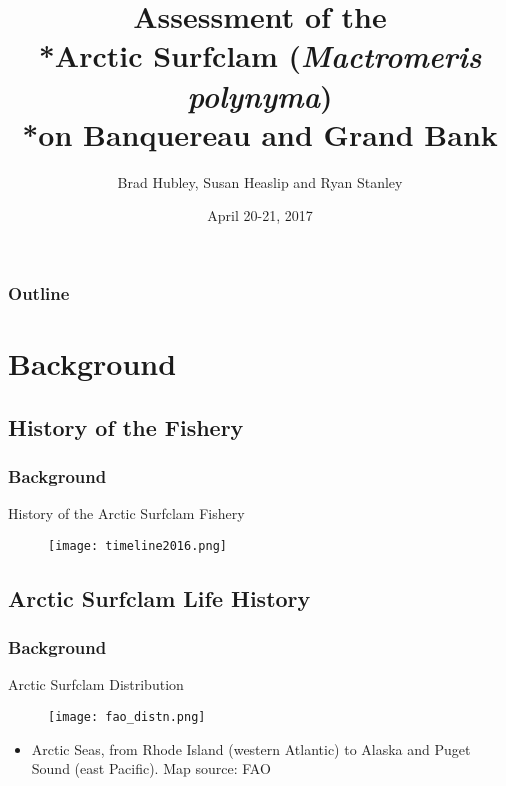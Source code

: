 \documentclass{beamer}
\title[Surfclam Assessment]{Assessment of the \\*Arctic Surfclam (\textit{Mactromeris polynyma}) \\*on Banquereau and Grand Bank}
\author{Brad Hubley, Susan Heaslip and Ryan Stanley}
\institute[DFO]{Science Branch, Fisheries and Oceans Canada}
\date{April 20-21, 2017}
\begin{document}
 
\frame{\titlepage}
 

\begin{frame}
\frametitle{Outline}
\tableofcontents
\end{frame}



\section{Background}
\subsection{History of the Fishery}
\begin{frame}
\frametitle{Background}
History of the Arctic Surfclam Fishery
\begin{figure}
        \begin{center}
            \texttt{[image: timeline2016.png]}
   \vspace{1cm}
	\end{center}
   
 \end{figure}

\end{frame}


\subsection{Arctic Surfclam Life History}

\begin{frame}
\frametitle{Background}
Arctic Surfclam Distribution
\begin{figure}
        \begin{center}
            \texttt{[image: fao\_distn.png]}
       
 \end{center}
    \end{figure}


\begin{itemize}
\item Arctic Seas, from Rhode Island (western Atlantic) to Alaska and Puget Sound (east Pacific). Map source: FAO
\end{itemize}

\end{frame}
\end{document}
